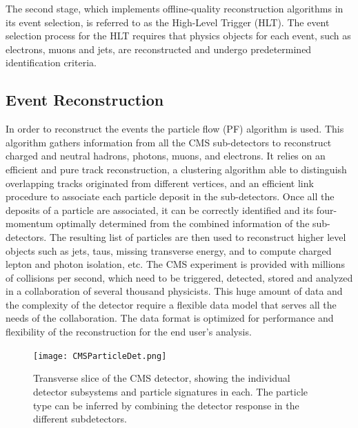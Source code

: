 The second stage, which implements offline-quality reconstruction algorithms in its event selection, is referred to as the High-Level Trigger (HLT)\cite{HLT}. The event selection process for the HLT requires that physics objects for each event, such as electrons, muons and jets, are reconstructed and undergo predetermined identification criteria. 

\subsection{Event Reconstruction}

In order to reconstruct the events the particle flow (PF) algorithm\cite{PFref} is used. This algorithm gathers information from all the CMS sub-detectors to reconstruct charged and neutral hadrons, photons, muons, and electrons. It relies on an efficient and pure track reconstruction, a clustering algorithm able to distinguish overlapping tracks originated from different vertices, and an efficient link procedure to associate each particle deposit in the sub-detectors. Once all the deposits of a particle are associated, it can be correctly identified and its four-momentum optimally determined from the combined information of the sub-detectors. The resulting list of particles are then used to reconstruct higher level objects such as jets, taus, missing transverse energy, and to compute charged lepton and photon isolation, etc\cite{Reco1}. The CMS experiment is provided with millions of collisions per second, which need to be triggered, detected, stored and analyzed in a collaboration of several thousand physicists. This huge amount of data and the complexity of the detector require a flexible data model that serves all the needs of the collaboration. The data format is optimized for performance and flexibility of the reconstruction for the end user's analysis.\\

\begin{figure}[tb]
\begin{center}
\texttt{[image: CMSParticleDet.png]} 
\caption{Transverse slice of the CMS detector, showing the individual detector subsystems and particle signatures in each. The particle type can be inferred by combining the detector response in the different subdetectors\cite{CMSslice}.}
\label{CMSParticleDet} 
\end{center}
\end{figure}

